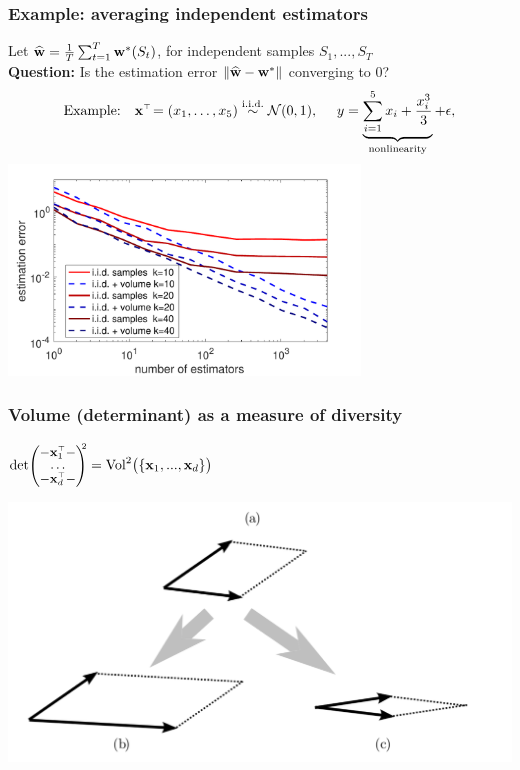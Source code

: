 \documentclass{beamer}
\begin{document}
\begin{frame}
  \frametitle{Example: averaging independent estimators}
Let $\widehat{\mathbf w} = \frac1T\sum_{t=1}^T\mathbf w^*(S_t)$, for
  independent samples $S_1,...,S_T$\pause\\[1mm]
\textbf{Question:} Is the estimation error $\|\widehat{\mathbf w}-\mathbf w^*\|$ converging
to 0?\pause
\begin{align*}
\text{Example:}\quad \x^\top\! = (x_1,\dots,x_5)\overset{\text{i.i.d.}}{\sim} \Nc(0,1) ,\quad\ y =
    \underbrace{\sum_{i=1}^5 x_i + \frac{x_i^3}{3}}_{\text{nonlinearity}} +\epsilon,
\end{align*}
  \centering
  \includegraphics[width=0.7\textwidth]{../figs/gaussian}
\end{frame}

\begin{frame}
  \frametitle{Volume (determinant) as a measure of diversity}
  $\det\!
\text{\fontsize{9}{9}\selectfont$\begin{pmatrix}
-\x_{1}^\top-\\
\dots\\
-\x_{d}^\top-
\end{pmatrix}^{\!\!\!2}$}= 
\mathrm{Vol}^2\big(\{\x_1,...,\x_d\}\big)$
\pause

  \centering
  \includegraphics[width=\textwidth]{../figs/volume_illustration.png}
    \let\thefootnote\relax{}
\end{frame}
\end{document}
